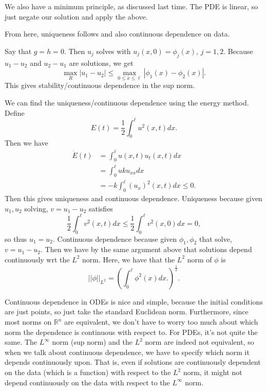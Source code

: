 \begin{remark}
	We also have a minimum principle, as discussed last time. The PDE is linear, so just negate our solution and apply the above.
\end{remark}

From here, uniqueness follows and also continuous dependence on data.

Say that \( g = h = 0 \). Then \( u_{j} \) solves with \( u_{j}(x, 0) = \phi_{j}(x) \), \( j = 1, 2 \). Because \( u_{1} - u_{2} \) and \( u_{2} - u_{1} \) are solutions, we get
\[ \max_{R} |u_{1} - u_{2}| \le \max_{0 \le x \le \ell} | \phi_{1}(x) - \phi_{2}(x)|. \]
This gives stability/continuous dependence in the sup norm.

\begin{proposition}
	We can find the uniqueness/continuous dependence using the energy method. Define
	\[ E(t) = \frac{1}{2} \int_{0}^{\ell} u^{2}(x, t) dx. \]
	Then we have
	\begin{align*}
		\dot{E}(t) &= \int_{0}^{\ell} u(x, t) u_{t}(x, t) dx
						\\ &= \int_{0}^{\ell}  u k u_{x x} dx \\
							&= -k \int_{0}^{\ell}  (u_{x})^{2}(x, t) dx \le 0.
	\end{align*}
	Then this gives uniqueness and continuous dependence. Uniqueness because given \( u_{1}, u_{2} \) solving, \( v = u_{1} - u_{2} \) satisfies
	\[ \frac{1}{2} \int_{0}^{\ell} v^{2}(x, t) dx \le \frac{1}{2} \int_{0}^{\ell} v^{2}(x, 0) dx = 0,  \]
	so thus \( u_{1} = u_{2} \). Continuous dependence because given \( \phi_{1}, \phi_{2} \) that solve, \( v= u_{1} - u_{2} \). Then we have by the same argument above that solutions depend continuously wrt the \( L^{2} \) norm. Here, we have that the \( L^{2} \) norm of \( \phi \) is
	\[ || \phi||_{L^{2}} = \left( \int_{0}^{\ell} \phi^{2}(x) dx. \right)^{\frac{1}{2}}. \]

	\begin{remark}
		Continuous dependence in ODEs is nice and simple, because the initial conditions are just points, so just take the standard Euclidean norm. Furthermore, since most norms on \( \mathbb{R}^{n} \) are equivalent, we don't have to worry too much about which norm the dependence is continuous with respect to. For PDEs, it's not quite the same. The \( L^{\infty} \) norm (sup norm) and the \( L^{2} \) norm are indeed not equivalent, so when we talk about continuous dependence, we have to specify which norm it depends continuously upon. That is, even if solutions are continuously dependent on the data (which is a function) with respect to the \( L^{2} \) norm, it might not depend continuously on the data with respect to the \( L^{\infty} \) norm.
	\end{remark}
\end{proposition}
